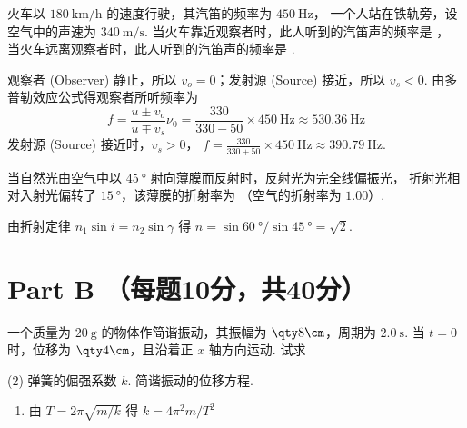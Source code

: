 \begin{problem}
  火车以 $\qty{180}{\km/\hour}$ 的速度行驶，其汽笛的频率为 $\qty{450}\Hz$，
  一个人站在铁轨旁，设空气中的声速为 $\qty{340}{\m/\s}$.
  当火车靠近观察者时，此人听到的汽笛声的频率是 ，
  当火车远离观察者时，此人听到的汽笛声的频率是 .
\end{problem}
\begin{solution}
  观察者 (Observer) 静止，所以 $v_o = 0$；发射源 (Source) 接近，所以 $v_s < 0$.
  由多普勒效应公式得观察者所听频率为
  \[
    f = \frac{u \pm v_o}{u \mp v_s}\nu_0
      = \frac{330}{330 - 50} \times \qty{450}\Hz \approx \qty{530.36}\Hz
  \]
  发射源 (Source) 接近时，$v_s > 0$，
  $f = \frac{330}{330 + 50} \times \qty{450}\Hz \approx \qty{390.79}\Hz$.
\end{solution}

\begin{problem}
  当自然光由空气中以 $\qty{45}\degree$ 射向薄膜而反射时，反射光为完全线偏振光，
  折射光相对入射光偏转了 $\qty{15}\degree$，该薄膜的折射率为 
  （空气的折射率为 $1.00$）.
\end{problem}
\begin{solution}
  由折射定律 $n_1\sin i = n_2\sin \gamma$ 得
  $n = \sin\qty{60}\degree/\sin\qty{45}\degree = \sqrt2$.
\end{solution}

\section{Part B （每题10分，共40分）}

\begin{problem}
  一个质量为 $\qty{20}\g$ 的物体作简谐振动，其振幅为 $\qty8\cm$，周期为 $\qty{2.0}\s$.
  当 $t = 0$ 时，位移为 $\qty4\cm$，且沿着正 $x$ 轴方向运动. 试求
  \begin{tasks}[ label = \arabic*. ](2)
    \task 弹簧的倔强系数 $k$.
    \task 简谐振动的位移方程.
  \end{tasks}
\end{problem}
\begin{solution}\leavevmode
  \begin{enumerate}
    \item 由 $T = 2\pi\sqrt{m/k}$ 得 $k = 4\pi^2m/T^2$
  \end{enumerate}
\end{solution}
